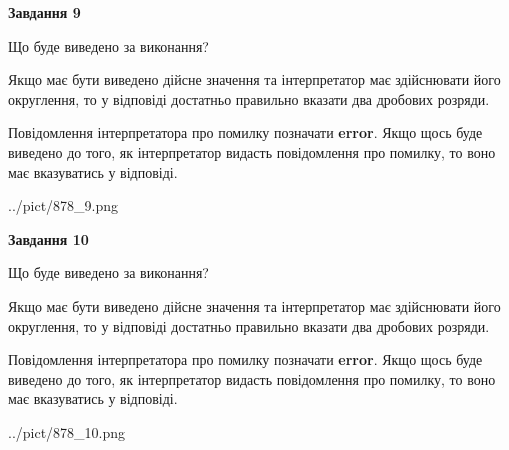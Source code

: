 \documentclass[12pt, ukrainian]{article}
\begin{document}
{\begin {Large}
{\begin {center}\textbf{Завдання 9}\end {center}}\par
Що буде виведено за виконання? \par

Якщо має бути виведено дійсне значення та інтерпретатор має здійснювати його округлення, 
то у відповіді достатньо правильно вказати два дробових розряди.

Повідомлення інтерпретатора про помилку позначати \textbf{error}.
Якщо щось буде виведено до того, як інтерпретатор видасть повідомлення про помилку, 
то воно має вказуватись у відповіді. \par

\begin{center}
	{../pict/878_9.png}
\end{center}
\newpage

{\begin {center}\textbf{Завдання 10}\end {center}}\par
Що буде виведено за виконання? \par

Якщо має бути виведено дійсне значення та інтерпретатор має здійснювати його округлення, 
то у відповіді достатньо правильно вказати два дробових розряди.

Повідомлення інтерпретатора про помилку позначати \textbf{error}.
Якщо щось буде виведено до того, як інтерпретатор видасть повідомлення про помилку, 
то воно має вказуватись у відповіді. \par

\begin{center}
	{../pict/878_10.png}
\end{center}
\newpage

\end {Large}}
\end{document}
